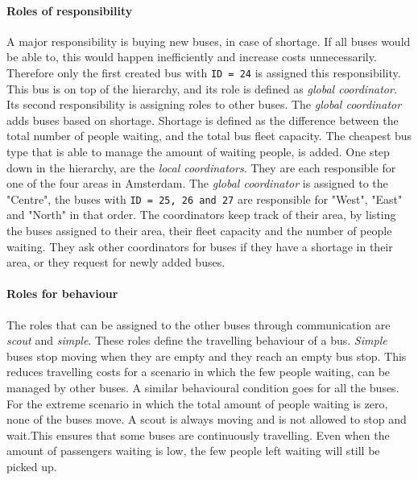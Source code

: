 \documentclass{article}
\begin{document}
\paragraph{Roles of responsibility}
A major responsibility is buying new buses, in case of shortage. If all buses would be able to, this would happen inefficiently and increase costs unnecessarily. Therefore only the first created bus with \texttt{ID = 24} is assigned this responsibility. This bus is on top of the hierarchy, and its role is defined as \textit{global coordinator}. Its second responsibility is assigning roles to other buses.
\newline
The \textit{global coordinator} adds buses based on shortage. Shortage is defined as the difference between the total number of people waiting, and the total bus fleet capacity. The cheapest bus type that is able to manage the amount of waiting people, is added.
\newline
{}
One step down in the hierarchy, are the \textit{local coordinators}. They are each responsible for one of the four areas in Amsterdam. The \textit{global coordinator} is assigned to the "Centre", the buses with \texttt{ID = 25, 26 and 27} are responsible for "West", "East" and "North" in that order. The coordinators keep track of their area, by listing the buses assigned to their area, their fleet capacity and the number of people waiting. They ask other coordinators for buses if they have a shortage in their area, or they request for newly added buses. 
\newline
\paragraph{Roles for behaviour}
The roles that can be assigned to the other buses through communication are \textit{scout} and \textit{simple}. These roles define the travelling behaviour of a bus. \textit{Simple} buses stop moving when they are empty and they reach an empty bus stop. This reduces travelling costs for a scenario in which the few people waiting, can be managed by other buses. A similar behavioural condition goes for all the buses. For the extreme scenario in which the total amount of people waiting is zero, none of the buses move. 
\newline
A scout is always moving and is not allowed to stop and wait.This ensures that some buses are continuously travelling. Even when the amount of passengers waiting is low, the few people left waiting will still be picked up.
\end{document}
